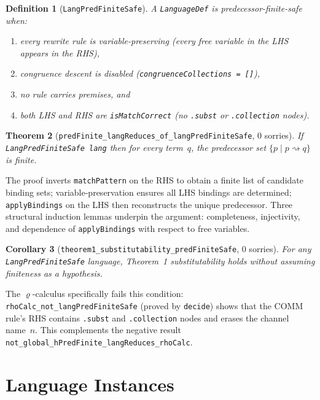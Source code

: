 \documentclass[]{article}
\newtheorem{theorem}{Theorem}
\newtheorem{definition}[theorem]{Definition}
\newtheorem{corollary}[theorem]{Corollary}
\newcommand{\code}[1]{\texttt{#1}}
\newcommand{\rhocalc}{\ensuremath{\varrho}}
\begin{document}
\begin{definition}[\code{LangPredFiniteSafe}]
A \code{LanguageDef} is \emph{predecessor-finite-safe} when:
\begin{enumerate}
\item every rewrite rule is \emph{variable-preserving}
      (every free variable in the LHS appears in the RHS),
\item congruence descent is disabled (\code{congruenceCollections = []}),
\item no rule carries premises, and
\item both LHS and RHS are \code{isMatchCorrect}
      (no \code{.subst} or \code{.collection} nodes).
\end{enumerate}
\end{definition}

\begin{theorem}[\code{predFinite\_langReduces\_of\_langPredFiniteSafe}, 0 sorries]
\label{thm:pred-finite-safe}
If \code{LangPredFiniteSafe lang} then for every term~$q$,
the predecessor set $\{p \mid p \rightsquigarrow q\}$ is finite.
\end{theorem}

The proof inverts \code{matchPattern} on the RHS to obtain a finite list of
candidate binding sets; variable-preservation ensures all LHS bindings are
determined; \code{applyBindings} on the LHS then reconstructs the unique
predecessor.  Three structural induction lemmas underpin the argument:
completeness, injectivity, and dependence of \code{applyBindings} with
respect to free variables.

\begin{corollary}[\code{theorem1\_substitutability\_predFiniteSafe}, 0 sorries]
For any \code{LangPredFiniteSafe} language, Theorem~1 substitutability holds
without assuming finiteness as a hypothesis.
\end{corollary}

The \rhocalc{}-calculus specifically fails this condition:
\code{rhoCalc\_not\_langPredFiniteSafe} (proved by \code{decide}) shows that
the COMM rule's RHS contains \code{.subst} and \code{.collection} nodes
and erases the channel name~$n$.
This complements the negative result
\code{not\_global\_hPredFinite\_langReduces\_rhoCalc}.

\section{Language Instances}
\label{sec:instances}
\end{document}
